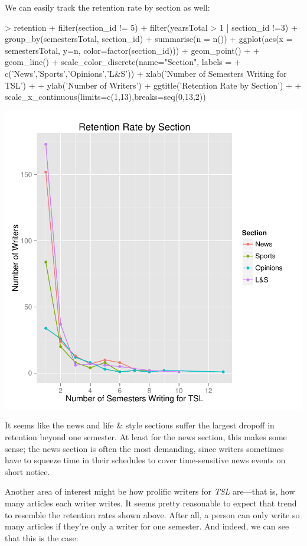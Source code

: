 \documentclass[a4paper]{article}
\begin{document}
We can easily track the retention rate by section as well:

\begin{Schunk}
\begin{Sinput}
> retention %
+   filter(section_id != 5) %
+   filter(yearsTotal > 1 | section_id !=3) %
+   group_by(semestersTotal, section_id) %
+   summarise(n = n()) %
+   ggplot(aes(x = semestersTotal, y=n, color=factor(section_id))) + geom_point() +
+   geom_line() + scale_color_discrete(name="Section", labels =
+   c('News','Sports','Opinions','L&S')) + xlab('Number of Semesters Writing for TSL') +
+   ylab('Number of Writers') + ggtitle('Retention Rate by Section') +
+   scale_x_continuous(limits=c(1,13),breaks=seq(0,13,2))
\end{Sinput}
\end{Schunk}
\includegraphics{FinalProject-016}

It seems like the news and life \& style sections suffer the largest dropoff in retention beyond one semester. At least for the news section, this makes some sense; the news section is often the most demanding, since writers sometimes have to squeeze time in their schedules to cover time-sensitive news events on short notice.

Another area of interest might be how prolific writers for \textit{TSL} are---that is, how many articles each writer writes. It seems pretty reasonable to expect that trend to resemble the retention rates shown above. After all, a person can only write so many articles if they're only a writer for one semester. And indeed, we can see that this is the case:
\end{document}
